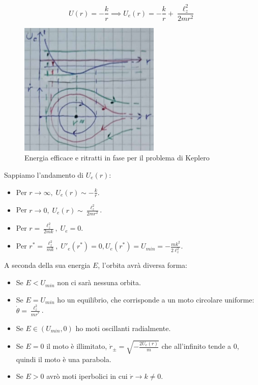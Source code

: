 \begin{example}
    \begin{equation}
        U(r )= -\frac{k}{r}\implies U_e(r )= -\frac{k}{r}+\frac{\ell_z^2}{2mr^2}
    \end{equation}

    \begin{figure}[ht]
        \centering
        \includegraphics[width=0.6\textwidth]{images/orbitaKeplero.png}
        \caption{Energia efficace e ritratti in fase per il problema di Keplero}
    \end{figure}
    
    Sappiamo l'andamento di $U_e (r )$:
    \begin{itemize}
        \item Per $r\rightarrow \infty, \; U_e(r )\sim -\frac{k}{r}$.
        \item Per $r\rightarrow 0,\; U_e (r ) \sim \frac{\ell_z^2}{2mr^2}$.
        \item Per $r = \frac{\ell_z^2}{2mk},\;  U_e = 0$.
        \item Per $r^*= \frac{\ell_z^2}{mk},\; U'_e(r^*)=0, U_e(r^*)= U_{min}=-\frac{mk^2}{2\ell_z^2}$.
    \end{itemize}

    A seconda della sua energia $E$, l'orbita avrà diversa forma:
    \begin{itemize}
        \item Se $E<U_{min}$ non ci sarà nessuna orbita.
        \item Se $E= U_{min}$ ho un equilibrio, che corrisponde a un moto circolare uniforme: $\dot{\theta}=\frac{\ell_z^2}{mr^*}$.
        \item Se $E\in (U_{min},0)$ ho moti oscillanti radialmente.
        \item Se $E=0 $ il moto è illimitato, $\dot{r}_\pm= \sqrt{-\frac{2U_e(r )}{m }}$ che all'infinito tende a $0$, quindi il moto è una parabola.
        \item Se $E>0$ avrò moti iperbolici in cui $\dot{r}\rightarrow k \neq 0$.
    \end{itemize}

\end{example}


